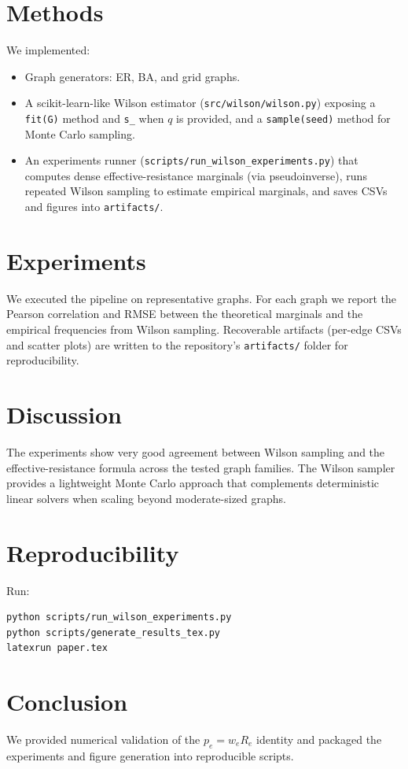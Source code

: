 \documentclass[10pt,aps,pre,twocolumn,nofootinbib,superscriptaddress,longbibliography]{revtex4-1}
\begin{document}
\section{Methods}
We implemented:
\begin{itemize}
  \item Graph generators: ER, BA, and grid graphs.
  \item A scikit-learn-like Wilson estimator (\texttt{src/wilson/wilson.py})
    exposing a \texttt{fit(G)} method and \texttt{s_} when $q$ is provided, and
    a \texttt{sample(seed)} method for Monte Carlo sampling.
  \item An experiments runner (\texttt{scripts/run_wilson_experiments.py}) that
    computes dense effective-resistance marginals (via pseudoinverse), runs
    repeated Wilson sampling to estimate empirical marginals, and saves CSVs
    and figures into \texttt{artifacts/}.
\end{itemize}

\section{Experiments}
We executed the pipeline on representative graphs. For each graph we report
the Pearson correlation and RMSE between the theoretical marginals and the
empirical frequencies from Wilson sampling. Recoverable artifacts (per-edge
CSVs and scatter plots) are written to the repository's \texttt{artifacts/}
folder for reproducibility.


\section{Discussion}
The experiments show very good agreement between Wilson sampling and the
effective-resistance formula across the tested graph families. The Wilson
sampler provides a lightweight Monte Carlo approach that complements
deterministic linear solvers when scaling beyond moderate-sized graphs.

\section{Reproducibility}
Run:\\
\begin{verbatim}
python scripts/run_wilson_experiments.py
python scripts/generate_results_tex.py
latexrun paper.tex
\end{verbatim}

\section{Conclusion}
We provided numerical validation of the $p_e = w_e R_e$ identity and
packaged the experiments and figure generation into reproducible scripts.



\end{document}
